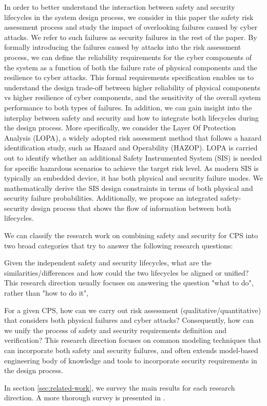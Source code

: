 \documentclass[journal]{IEEEtran}
\begin{document}
In order to better understand the interaction between safety and security lifecycles in the system design process, we consider in this paper the safety risk assessment process and study the impact of overlooking failures caused by cyber attacks. We refer to such failures as security failures in the rest of the paper. By formally introducing the failures caused by attacks into the risk assessment process, we can define the reliability requirements for the cyber components of the system as a function of both the failure rate of physical components and the resilience to cyber attacks. This formal requirements specification enables us to understand the design trade-off between higher reliability of physical components vs higher resilience of cyber components, and the sensitivity of the overall system performance to both types of failures. In addition, we can gain insight into the interplay between safety and security and how to integrate both lifecycles during the design process. More specifically, we consider the Layer Of Protection Analysis (LOPA), a widely adopted risk assessment method that follows a hazard identification study, such as Hazard and Operability (HAZOP). LOPA is carried out to identify whether an additional Safety Instrumented System (SIS) is needed for specific hazardous scenarios to achieve the target risk level. As modern SIS is typically an embedded device, it has both physical and security failure modes. We mathematically derive the SIS design constraints in terms of both physical and security failure probabilities. Additionally, we propose an integrated safety-security design process that shows the flow of information between both lifecycles.

We can classify the research work on combining safety and security for CPS into two broad categories that try to answer the following research questions: \begin{inparaenum}[(1)] \item Given the independent safety and security lifecycles, what are the similarities/differences and how could the two lifecycles be aligned or unified? This research direction usually focuses on answering the question "what to do", rather than "how to do it", \item For a given CPS, how can we carry out risk assessment (qualitative/quantitative) that considers both physical failures and cyber attacks? Consequently, how can we unify the process of safety and security requirements definition and verification? This research direction focuses on common modeling techniques that can incorporate both safety and security failures, and often extends model-based engineering body of knowledge and tools to incorporate security requirements in the design process. \end{inparaenum} In section \ref{sec:related-work}, we survey the main results for each research direction. A more thorough survey is presented in \cite{Kriaa2015b,Lyu2019SafetySystems}.
\end{document}
